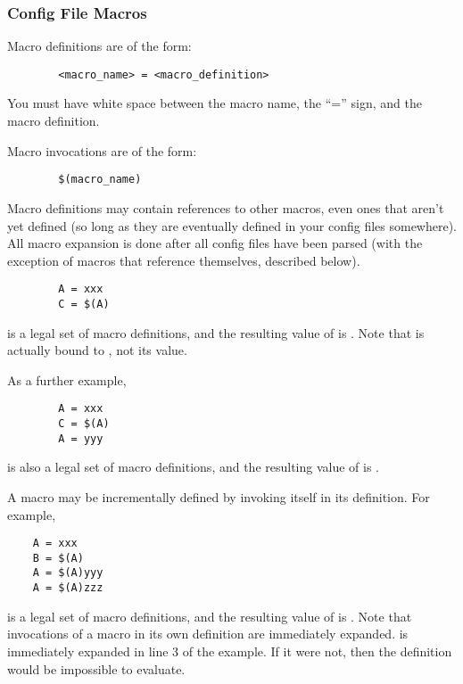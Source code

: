 \subsubsection{\label{sec:Config-File-Macros}
Config File Macros}


Macro definitions are of the form:
\begin{verbatim}
        <macro_name> = <macro_definition>
\end{verbatim}

\Note You must have white space between the macro name, the
``='' sign, and the macro definition.

Macro invocations are of the form: 
\begin{verbatim}
        $(macro_name)
\end{verbatim}

Macro definitions may contain references to other macros, even ones
that aren't yet defined (so long as they are eventually defined in
your config files somewhere).
All macro expansion is done after all config files have been parsed
(with the exception of macros that reference themselves, described
below). 

\begin{verbatim}
        A = xxx
        C = $(A) 
\end{verbatim}
is a legal set of macro definitions, and the resulting value of 
 is
.
Note that
 is actually bound to 
, not its value.

As a further example,
\begin{verbatim}
        A = xxx
        C = $(A)
        A = yyy
\end{verbatim}
is also a legal set of macro definitions, and the resulting value of
 is .  

A macro may be incrementally defined by invoking itself in its
definition.  For example,
\begin{verbatim}
	A = xxx
	B = $(A)
	A = $(A)yyy
	A = $(A)zzz
\end{verbatim}
is a legal set of macro definitions, and the resulting value of 
is .
Note that invocations of a macro in
its own definition are immediately
expanded.
 is immediately expanded in line 3 of the example.
If it were not, then the definition would be impossible to
evaluate.

